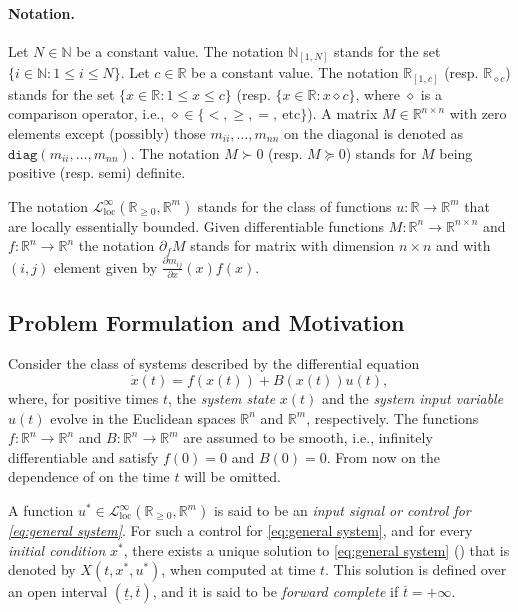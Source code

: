 \documentclass[10pt,twocolumn,twoside]{IEEEtran}
\theoremstyle{plain}
\theoremstyle{definition}
\theoremstyle{remark}
\begin{document}
\paragraph{Notation.} Let $N\in\mathbb{N}$ be a constant value. The notation $\mathbb{N}_{[1,N]}$ stands for the set $\{i\in\mathbb{N}:1\leq i\leq N\}$. Let $c\in\mathbb{R}$ be a constant value. The notation $\mathbb{R}_{[1,c]}$ (resp. $\mathbb{R}_{\diamond c}$) stands for the set $\{x\in\mathbb{R}:1\leq x\leq c\}$ (resp.  $\{x\in\mathbb{R}:x\diamond c\}$, where $\diamond$ is a comparison operator, i.e., $\diamond\in\{<,\geq,=,\ \text{etc}\}$). A matrix $M\in\mathbb{R}^{n\times n}$ with zero elements except (possibly) those  $m_{ii},\ldots,m_{nn}$ on the diagonal is denoted as $\mathbin{\mathtt{diag}}(m_{ii},\ldots,m_{nn})$. The notation $M\succ 0$ (resp. $M\succeq 0$) stands for $M$ being positive (resp. semi) definite.

The notation $\mathcal{L}_{\mathrm{loc}}^\infty(\mathbb{R}_{\geq0},\mathbb{R}^m)$ stands for the class of functions $u:\mathbb{R}\to\mathbb{R}^m$ that are locally essentially bounded. Given differentiable functions $M:\mathbb{R}^n\to\mathbb{R}^{n\times n}$ and $f:\mathbb{R}^n\to\mathbb{R}^n$ the notation $\partial_fM$ stands for matrix with dimension $n\times n$ and with $(i,j)$ element given by $\frac{\partial m_{ij}}{\partial x}(x)f(x)$.


\subsection{Problem Formulation and Motivation}\label{sec:Problem Formulation and Motivation}

 Consider the class of systems described by the differential equation
\begin{equation}\label{eq:general system}
	\dot{x}(t)=f(x(t))+B(x(t))u(t),	
\end{equation}
where, for positive times $t$, the \emph{system state} $x(t)$ and the \emph{system input variable} $u(t)$ evolve in the Euclidean spaces $\mathbb{R}^n$ and $\mathbb{R}^m$, respectively. The functions $f:\mathbb{R}^n\to\mathbb{R}^n$ and $B:\mathbb{R}^n\to\mathbb{R}^m$ are assumed to be smooth, i.e., infinitely differentiable and satisfy $f(0)=0$ and $B(0)=0$. From now on the dependence of on the time $t$ will be omitted.

A function $u^\ast\in\mathcal{L}_{\mathrm{loc}}^\infty(\mathbb{R}_{\geq0},\mathbb{R}^m)$ is said to be an \emph{input signal or control for \eqref{eq:general system}}. For such a control for \eqref{eq:general system}, and for every \emph{initial condition} $x^\ast$, there exists a unique solution to \eqref{eq:general system} (\cite{Teschl2012}) that is denoted by $X(t,x^\ast,u^\ast)$, when computed at time $t$. This solution is defined over an open interval $(\underline{t},\overline{t})$, and it is said to be \emph{forward complete} if $\overline{t}=+\infty$.
\end{document}
